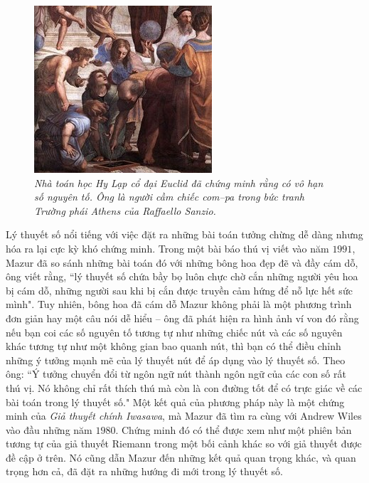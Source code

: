 \begin{multicols}{2}
\begin{figure}[H]
		\includegraphics[width=0.9\linewidth]{3}
		\caption{\small\textit{\color{duongvaotoanhoc}Nhà toán học Hy Lạp cổ đại Euclid đã chứng minh rằng có vô hạn số nguyên tố. Ông là người cầm chiếc com--pa trong bức tranh Trường phái Athens của Raffaello Sanzio.}}
		\vspace*{-10pt}
	\end{figure}
	Lý thuyết số nổi tiếng với việc đặt ra những bài toán tưởng chừng dễ dàng nhưng hóa ra lại cực kỳ khó chứng minh. Trong một bài báo thú vị viết vào năm $1991$, Mazur đã so sánh những bài toán đó với những bông hoa đẹp đẽ và đầy cám dỗ, ông viết rằng, ``lý thuyết số chứa bầy bọ luôn chực chờ cắn những người yêu hoa bị cám dỗ, những người sau khi bị cắn được truyền cảm hứng để nỗ lực hết sức mình".
	\vskip 0.05cm
	Tuy nhiên, bông hoa đã cám dỗ Mazur không phải là một phương trình đơn giản hay một câu nói dễ hiểu -- ông đã phát hiện ra hình ảnh ví von đó rằng nếu bạn coi các số nguyên tố tương tự như những chiếc nút và các số nguyên khác tương tự như một không gian bao quanh nút, thì bạn có thể điều chỉnh những ý tưởng mạnh mẽ của lý thuyết nút để áp dụng vào lý thuyết số. Theo ông: ``Ý tưởng chuyển đổi từ ngôn ngữ nút thành ngôn ngữ của các con số rất thú vị. Nó không chỉ rất thích thú mà còn là con đường tốt để có trực giác về các bài toán trong lý thuyết số."
	\vskip 0.05cm
	Một kết quả của phương pháp này là một chứng minh của \textit{Giả thuyết chính Iwasawa}, mà Mazur đã tìm ra cùng với Andrew Wiles vào đầu những năm $1980$. Chứng minh đó có thể được xem như một phiên bản tương tự của giả thuyết Riemann trong một bối cảnh khác so với giả thuyết được đề cập ở trên. Nó cũng dẫn Mazur đến những kết quả quan trọng khác, và quan trọng hơn cả, đã đặt ra những hướng đi mới trong lý thuyết số.

\end{multicols}
